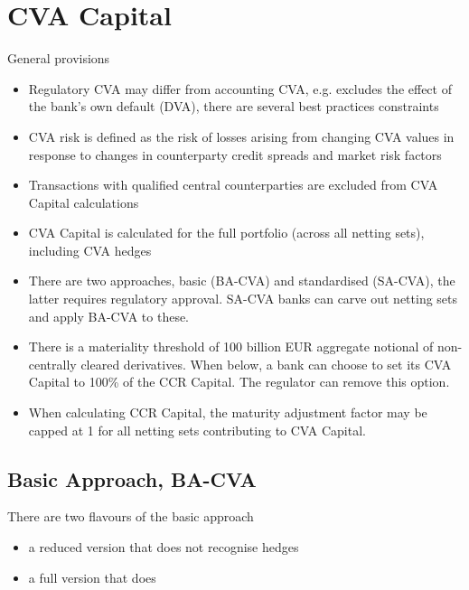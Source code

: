 \section{CVA Capital}\label{sec:cva}

General provisions
\begin{itemize}
\item Regulatory CVA may differ from accounting CVA, e.g. excludes the effect of the bank's own default (DVA), there are several best practices constraints
\item CVA risk is defined as the risk of losses arising from changing CVA values in response to changes in counterparty credit spreads and market risk factors
\item Transactions with qualified central counterparties are excluded from CVA Capital calculations
\item CVA Capital is calculated for the full portfolio (across all netting sets), including CVA hedges
\item There are two approaches, basic (BA-CVA) and standardised (SA-CVA), the latter requires regulatory approval. SA-CVA banks can carve out netting sets and apply BA-CVA to these.
\item There is a materiality threshold of 100 billion EUR aggregate notional of non-centrally cleared derivatives. When below, a bank can choose to set its CVA Capital to 100\% of the CCR Capital. The regulator can remove this option.
\item When calculating CCR Capital, the maturity adjustment factor may be capped at 1 for all netting sets contributing to CVA Capital.
\end{itemize}
 
\subsection{Basic Approach, BA-CVA}\label{sec:ba-cva}

There are two flavours of the basic approach
\begin{itemize}
\item a reduced version that does not recognise hedges
\item a full version that does
\end{itemize}

